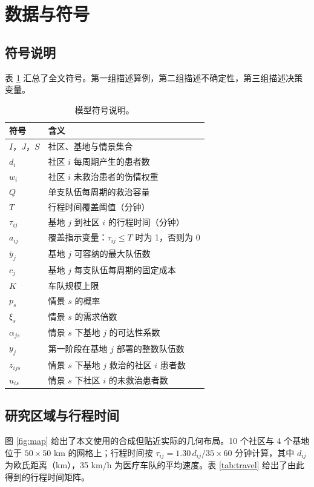 \documentclass[12pt,a4paper,fontset=windows]{ctexart}
\begin{document}
\section{数据与符号}

\subsection{符号说明}

表 \ref{tab:notation} 汇总了全文符号。第一组描述算例，第二组描述不确定性，第三组描述决策变量。

\begin{table}[!ht]
\centering
\caption{模型符号说明。}
\label{tab:notation}
\small
\begin{tabular}{ll}
\toprule
符号 & 含义 \\
\midrule
$I$，$J$，$S$ & 社区、基地与情景集合 \\
$d_i$ & 社区 $i$ 每周期产生的患者数 \\
$w_i$ & 社区 $i$ 未救治患者的伤情权重 \\
$Q$ & 单支队伍每周期的救治容量 \\
$T$ & 行程时间覆盖阈值（分钟） \\
$\tau_{ij}$ & 基地 $j$ 到社区 $i$ 的行程时间（分钟） \\
$a_{ij}$ & 覆盖指示变量：$\tau_{ij}\le T$ 时为 1，否则为 0 \\
$\bar y_j$ & 基地 $j$ 可容纳的最大队伍数 \\
$c_j$ & 基地 $j$ 每支队伍每周期的固定成本 \\
$K$ & 车队规模上限 \\
$p_s$ & 情景 $s$ 的概率 \\
$\xi_s$ & 情景 $s$ 的需求倍数 \\
$\alpha_{js}$ & 情景 $s$ 下基地 $j$ 的可达性系数 \\
$y_j$ & 第一阶段在基地 $j$ 部署的整数队伍数 \\
$z_{ijs}$ & 情景 $s$ 下基地 $j$ 救治的社区 $i$ 患者数 \\
$u_{is}$ & 情景 $s$ 下社区 $i$ 的未救治患者数 \\
\bottomrule
\end{tabular}
\end{table}

\subsection{研究区域与行程时间}

图 \ref{fig:map} 给出了本文使用的合成但贴近实际的几何布局。10 个社区与 4 个基地位于 $50\times50$ km 的网格上；行程时间按 $\tau_{ij}=1.30\,d_{ij}/35\times60$ 分钟计算，其中 $d_{ij}$ 为欧氏距离（km），35 km/h 为医疗车队的平均速度。表 \ref{tab:travel} 给出了由此得到的行程时间矩阵。
\end{document}
